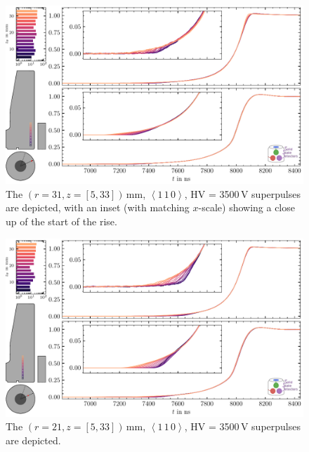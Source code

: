 \begin{figure}[H]
    \centering
    \includegraphics[width=6in]{figs/library/slow_axis_r_31_pulses.pdf}
    \caption{The $(r = 31, z = [5,33])$\,mm, $\left<1\,1\,0\right>$, HV = 3500\,V superpulses are depicted, with an inset (with matching $x$-scale) showing a close up of the start of the rise.}
\end{figure}
\begin{figure}[H]
    \centering
    \includegraphics[width=6in]{figs/library/slow_axis_r_21_pulses.pdf}
    \caption{The $(r = 21, z = [5,33])$\,mm, $\left<1\,1\,0\right>$, HV = 3500\,V superpulses are depicted.}
\end{figure}

